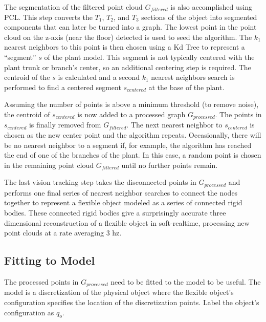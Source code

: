 \documentclass[runningheads,a4paper]{llncs}
\begin{document}
The segmentation of the filtered point cloud $G_{filtered}$ is also accomplished using PCL. This step converts the $T_1$, $T_2$, and $T_3$ sections of the object into segmented components that can later be turned into a graph. The lowest point in the point cloud on the z-axis (near the floor) detected is used to seed the algorithm. The $k_1$ nearest neighbors to this point is then chosen using a Kd Tree to represent a “segment” $s$ of the plant model. This segment is not typically centered with the plant trunk or branch’s center, so an additional centering step is required. The centroid of the $s$ is calculated and a second $k_1$ nearest neighbors search is performed to find a centered segment $s_{centered}$ at the base of the plant.

Assuming the number of points is above a minimum threshold (to remove noise), the centroid of $s_{centered}$ is now added to a processed graph $G_{processed}$. The points in $s_{centered}$ is finally removed from $G_{filtered}$. The next nearest neighbor to $s_{centered}$ is chosen as the new center point and the algorithm repeats. Occasionally, there will be no nearest neighbor to a segment if, for example, the algorithm has reached the end of one of the branches of the plant. In this case, a random point is chosen in the remaining point cloud $G_{filtered}$ until no further points remain.

The last vision tracking step takes the disconnected points in $G_{processed}$ and performs one final series of nearest neighbor searches to connect the nodes together to represent a flexible object modeled as a series of connected rigid bodies. These connected rigid bodies give a surprisingly accurate three dimensional reconstruction of a flexible object in soft-realtime, processing new point clouds at a rate averaging 3 hz.

\subsection{Fitting to Model \label{sec-fit}}

The processed points in $G_{processed}$ need to be fitted to the model to be useful. The model is a discretization of the physical object where the flexible object's configuration specifies the location of the discretization points. Label the object’s configuration as $q_o$. 
\end{document}
